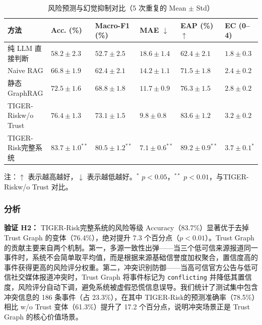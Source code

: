 \documentclass[12pt,a4paper]{article}
\newcommand{\projectshort}{TIGER-Risk}
\begin{document}
\begin{table}[H]
\centering
\footnotesize
\caption{风险预测与幻觉抑制对比（5 次重复的 Mean $\pm$ Std）}
\label{tab:exp-prediction}
\begin{tabularx}{0.95\linewidth}{>{\raggedright\arraybackslash}p{2.6cm} >{\centering\arraybackslash}X >{\centering\arraybackslash}X >{\centering\arraybackslash}X >{\centering\arraybackslash}X >{\centering\arraybackslash}X}
\toprule
\textbf{方法} & \textbf{Acc. (\%)} & \textbf{Macro-F1 (\%)} & \textbf{MAE $\downarrow$} & \textbf{EAP (\%) $\uparrow$} & \textbf{EC (0--4)} \\
\midrule
纯 LLM 直接判断 & $58.2 \pm 2.3$ & $52.7 \pm 2.5$ & $18.6 \pm 1.4$ & $62.4 \pm 2.1$ & $1.8 \pm 0.3$ \\
Naive RAG & $66.8 \pm 1.9$ & $62.4 \pm 2.1$ & $14.2 \pm 1.1$ & $71.5 \pm 1.8$ & $2.4 \pm 0.2$ \\
静态 GraphRAG & $72.5 \pm 1.6$ & $68.8 \pm 1.8$ & $11.7 \pm 0.9$ & $76.3 \pm 1.5$ & $2.8 \pm 0.2$ \\
\projectshort w/o Trust & $76.4 \pm 1.3$ & $73.1 \pm 1.5$ & $9.8 \pm 0.8$ & $83.6 \pm 1.2$ & $3.2 \pm 0.2$ \\
\projectshort 完整系统 & $\mathbf{83.7 \pm 1.0}^{**}$ & $\mathbf{80.5 \pm 1.2}^{**}$ & $\mathbf{7.1 \pm 0.6}^{**}$ & $\mathbf{89.2 \pm 0.9}^{**}$ & $\mathbf{3.7 \pm 0.1}^{*}$ \\
\bottomrule
\end{tabularx}
\end{table}

注：$\uparrow$ 表示越高越好，$\downarrow$ 表示越低越好。$^{*}$ $p < 0.05$，$^{**}$ $p < 0.01$，与\projectshort w/o Trust 对比。

\subsubsection{分析}

\textbf{验证 H2：} \projectshort 完整系统的风险等级 Accuracy（83.7\%）显著优于去掉 Trust Graph 的变体（76.4\%），绝对提升 7.3 个百分点（$p < 0.01$）。Trust Graph 的贡献主要来自两个机制。第一，多源一致性出弹——当三个低可信来源报道同一事件时，系统不会简单取平均值，而是根据来源基础信誉度加权聚合，置信度高的事件获得更高的风险评分权重。第二，冲突识别防御——当高可信官方公告与低可信社交媒体报道冲突时，Trust Graph 将事件标记为 \texttt{conflicting} 并降低其置信度，风险评分自动下调，避免系统被虚假恐慌信息误导。我们统计了测试集中包含冲突信息的 186 条事件（占 23.3\%），在其中 \projectshort 的预测准确率（78.5\%）相比 w/o Trust 变体（61.3\%）提升了 17.2 个百分点，说明冲突场景正是 Trust Graph 的核心价值场景。
\end{document}
